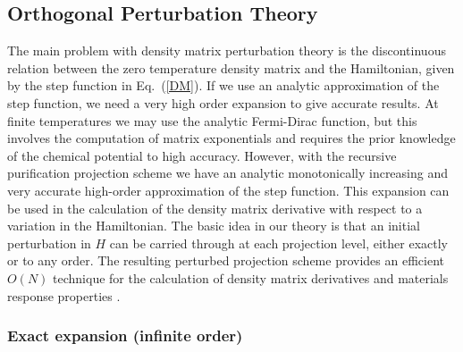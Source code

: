 \documentclass[twocolumn,showpacs,preprintnumbers,amsmath,amssymb]{revtex4}
\begin{document}
\subsection{Orthogonal Perturbation Theory}

The main problem with density matrix perturbation theory is the
discontinuous relation between the zero temperature density matrix
and the Hamiltonian, given by the step function in Eq.\ (\ref{DM}). 
If we use an analytic approximation of the step
function, we need a very high order expansion to give accurate results. 
At finite temperatures we may use the analytic Fermi-Dirac function, but this involves
the computation of matrix exponentials and requires the prior knowledge
of the chemical potential to high accuracy.
However, with the recursive purification projection scheme we have an analytic
monotonically increasing and very accurate high-order approximation of the step function.
This expansion can be used in the calculation of the density matrix derivative with respect
to a variation in the Hamiltonian.  The basic idea in our theory is that 
an initial perturbation in $H$ can be carried through at each projection
level, either exactly or to any order. The resulting
perturbed projection scheme provides an efficient $O(N)$ technique for
the calculation of density matrix derivatives and materials response properties 
\cite{NiklassonPRT1,WeberPRT2}.

\subsubsection{Exact expansion (infinite order)}
\end{document}
